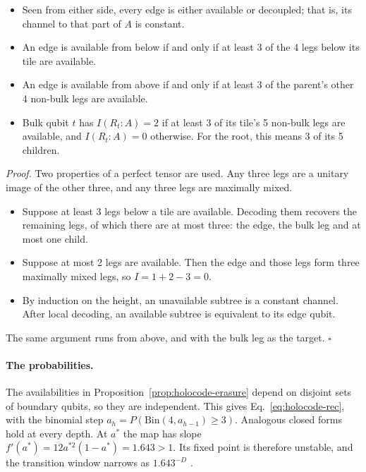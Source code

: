 \begin{proposition}\label{prop:holocode-erasure}
\leavevmode
\begin{itemize}[nosep]
\item Seen from either side, every edge is either available or decoupled; that is, its channel to that part of $A$ is constant.
\item An edge is available from below if and only if at least 3 of the 4 legs below its tile are available.
\item An edge is available from above if and only if at least 3 of the parent's other 4 non-bulk legs are available.
\item Bulk qubit $t$ has $I(R_t\!:\!A)=2$ if at least 3 of its tile's 5 non-bulk legs are available, and $I(R_t\!:\!A)=0$ otherwise.
  For the root, this means 3 of its 5 children.
\end{itemize}
\end{proposition}

\noindent\emph{Proof.} Two properties of a perfect tensor are used. Any three legs are a unitary image of the other three, and any
three legs are maximally mixed.
\begin{itemize}[nosep]
\item Suppose at least 3 legs below a tile are available. Decoding them recovers the remaining legs, of which there are at most three:
  the edge, the bulk leg and at most one child.
\item Suppose at most 2 legs are available. Then the edge and those legs form three maximally mixed legs, so $I=1+2-3=0$.
\item By induction on the height, an unavailable subtree is a constant channel. After local decoding, an available subtree is
  equivalent to its edge qubit.
\end{itemize}
The same argument runs from above, and with the bulk leg as the target. \hfill$\square$

\paragraph{The probabilities.} The availabilities in Proposition~\ref{prop:holocode-erasure} depend on disjoint sets of boundary
qubits, so they are independent. This gives Eq.~\eqref{eq:holocode-rec}, with the binomial step
$a_h=P(\mathrm{Bin}(4,a_{h-1})\ge3)$. Analogous closed forms hold at every depth. At $a^*$ the map has slope
$f'(a^*)=12a^{*2}(1-a^*)=1.643>1$. Its fixed point is therefore unstable, and the transition window narrows as $1.643^{-D}$
.

